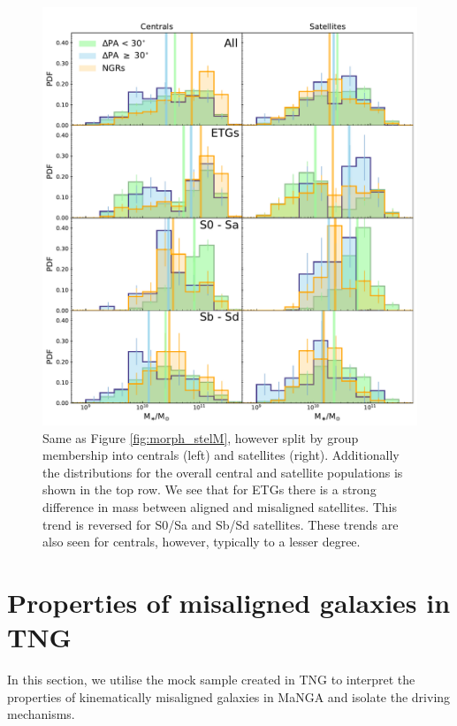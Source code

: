 \documentclass[fleqn,usenatbib]{mnras}
\begin{document}
\begin{figure}
	\includegraphics[width=\linewidth]{cen_sat/delPA_stelM_morph_lim.pdf}
    \caption{Same as Figure \ref{fig:morph_stelM}, however split by group membership into centrals (left) and satellites (right). Additionally the distributions for the overall central and satellite populations is shown in the top row. We see that for ETGs there is a strong difference in mass between aligned and misaligned satellites. This trend is reversed for S0/Sa and Sb/Sd satellites. These trends are also seen for centrals, however, typically to a lesser degree.}
    \label{fig:group_morph_stelM}
\end{figure}

\section{Properties of misaligned galaxies in TNG}
In this section, we utilise the mock sample created in TNG to interpret the properties of kinematically misaligned galaxies in MaNGA and isolate the driving mechanisms. 
\end{document}
